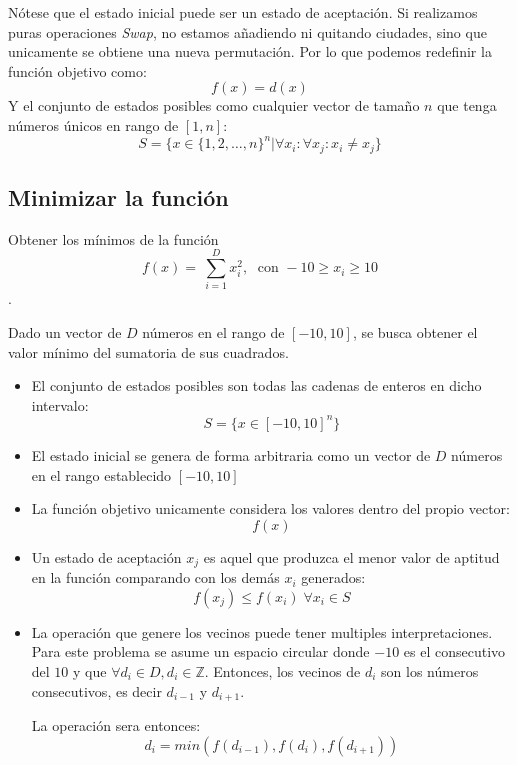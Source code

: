 \documentclass[12pt,twoside]{article}
\begin{document}
	
	
	Nótese que el estado inicial puede ser un estado de aceptación. Si realizamos puras operaciones \textit{Swap}, no estamos añadiendo ni quitando ciudades, sino que unicamente se obtiene una nueva permutación. Por lo que podemos redefinir la función objetivo como: \[ f(x) = d(x) \] Y el conjunto de estados posibles como cualquier vector de tamaño $n$ que tenga números únicos en rango de $[1,n]$: \[ S = \{ x \in \{1, 2, \dots, n  \}^n | \forall x_i \colon \forall x_j \colon x_i \neq x_j \}\]
	
	\subsection{Minimizar la función}
	
	Obtener los mínimos de la función \[ f(x) = \ \sum_{i = 1}^{D} x_i^2, \; \text{ con } -10 \geq x_i \geq 10 \].
	
	Dado un vector de $D$ números en el rango de $[-10, 10]$, se busca obtener el valor mínimo del sumatoria  de sus cuadrados.
	
	\begin{itemize}
		\item El conjunto de estados posibles son todas las cadenas de enteros en dicho intervalo: \[ S = \{ x \in [-10, 10]^n \} \]
		
		\item El estado inicial se genera de forma arbitraria como un vector de $D$ números en el rango establecido $[-10, 10]$
		
		\item La función objetivo unicamente considera los valores dentro del propio vector: \[f(x) \]
		
		\item Un estado de aceptación $x_j$ es aquel que produzca el menor valor de aptitud en la función comparando con los demás $x_i$ generados: \[ f(x_j) \leq f(x_i) \; \forall x_i \in S\] 
		
		\item La operación que genere los vecinos puede tener multiples interpretaciones. Para este problema se asume un espacio circular donde $-10$ es el consecutivo del $10$ y que $\forall d_i \in D, d_i \in \mathbb{Z}$.  Entonces, los vecinos de $d_i$ son los números consecutivos, es decir $d_{i-1}$ y $d_{i+1}$.
		
		La operación sera entonces:
		\[ d_i = min(f(d_{i-1}), f(d_i), f(d_{i+1})) \]	
	\end{itemize}
	
\end{document}
